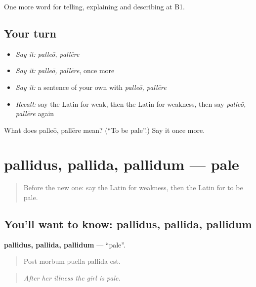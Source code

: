 \begin{grammarlens}[title={What you've built}]
One more word for telling, explaining and describing at B1.
\end{grammarlens}

\subsection*{Your turn}
\begin{itemize}
\raggedright
  \item \emph{Say it:} \emph{palleō, pallēre}
  \item \emph{Say it:} \emph{palleō, pallēre}, once more
  \item \emph{Say it:} a sentence of your own with \emph{palleō, pallēre}
  \item \emph{Recall:} say the Latin for weak, then the Latin for weakness, then say \emph{palleō, pallēre} again
\end{itemize}

\begin{tcolorbox}[breakable,colback=teal!4,colframe=teal!35!black,title={Before you move on}]
What does palleō, pallēre mean? (\textquotedblleft{}To be pale\textquotedblright{}.) Say it once more.
\end{tcolorbox}
\section[pallidus, pallida, pallidum]{pallidus, pallida, pallidum — pale}

\label{lesson:LA-C522-pallidus}



\begin{quote}
Before the new one: say the Latin for weakness, then the Latin for to be pale.
\end{quote}

\subsection*{You'll want to know: pallidus, pallida, pallidum}
\textbf{pallidus, pallida, pallidum} — \textquotedblleft{}pale\textquotedblright{}.

\begin{quote}
Post morbum puella pallida est.
\end{quote}

\begin{quote}
\emph{After her illness the girl is pale.}
\end{quote}

